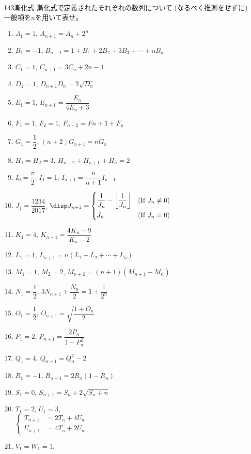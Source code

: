 \begin{thm}{143}{}{漸化式}
 漸化式で定義されたそれぞれの数列について (なるべく推測をせずに) 一般項を$n$を用いて表せ。
 \begin{enumerate}
  \item $A_1=1$, $A_{n+1}=A_n+2^n$
  \item $B_1=-1$, $B_{n+1}=1+B_1+2B_2+3B_3+\cdots+nB_n$
  \item $C_1=1$, $C_{n+1}=3C_n+2n-1$
  \item $D_1=1$, $D_{n+1}D_n=2\sqrt{D_n}$
  \item $E_1=1$, $E_{n+1}=\dfrac{E_n}{4E_n+3}$
  \item $F_1=1$, $F_2=1$, $F_{n+2}=F{n+1}+F_n$
  \item $G_1=\dfrac{1}{2}$, $(n+2)G_{n+1}=nG_n$
  \item $H_1=H_2=3$, $H_{n+2}+H_{n+1}+H_n=2$
  \item $I_0=\dfrac{\pi}{2}$, $I_1=1$, $I_{n+1}=\dfrac{n}{n+1}I_{n-1}$
  \item $J_1=\dfrac{1234}{2017}$, 
	$\disp J_{n+1}=\left\{
	\begin{aligned}
	 &\frac{1}{J_n}-\left\lfloor\frac{1}{J_n}\right\rfloor & &\text{(If $J_n\neq 0$)} \\
	 &J_n & &\text{(If $J_n=0$)}
	\end{aligned}
	 \right.$
  \item $K_1=4$, $K_{n+1}=\dfrac{4K_n-9}{K_n-2}$
  \item $L_1=1$, $L_{n+1}=n(L_1+L_2+\cdots+L_n)$
  \item $M_1=1$, $M_2=2$, $M_{n+2}=(n+1)(M_{n+1}-M_n)$
  \item $N_1=\dfrac{1}{2}$, $3N_{n+1}+\dfrac{N_n}{2}=1+\dfrac{1}{2^n}$
  \item $O_1=\dfrac{1}{2}$, $O_{n+1}=\sqrt{\dfrac{1+O_n}{2}}$
  \item $P_1=2$, $P_{n+1}=\dfrac{2P_n}{1-P_n^2}$
  \item $Q_1=4$, $Q_{n+1}=Q_n^2-2$
  \item $R_1=-1$, $R_{n+1}=2R_n(1-R_n)$
  \item $S_1=0$, $S_{n+1}=S_n+2\sqrt{S_n+n}$
  \item $T_1=2$, $U_1=3$,\\
	$\left\{
	\begin{aligned}
	 T_{n+1}&=2T_n+4U_n \\
	 U_{n+1}&=4T_n+2U_n
	\end{aligned}
	\right.$
  \item $V_1=W_1=1$, \\

\end{enumerate}
\end{thm}
